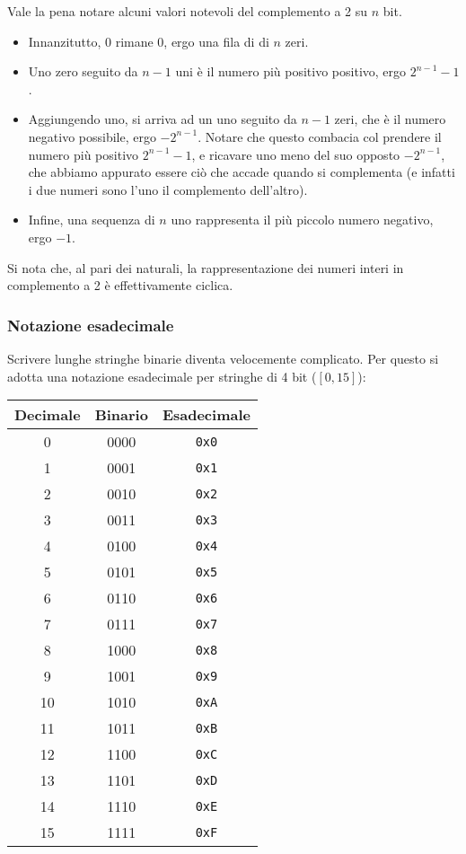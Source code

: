 \documentclass[a4paper,11pt]{article}
\begin{document}
Vale la pena notare alcuni valori notevoli del complemento a 2 su $n$ bit.
\begin{itemize}
	\item Innanzitutto, 0 rimane 0, ergo una fila di di $n$ zeri.
	\item Uno zero seguito da $n-1$ uni è il numero più positivo positivo, ergo $2^{n-1} -1$.
	\item Aggiungendo uno, si arriva ad un uno seguito da $n - 1$ zeri, che è il numero negativo possibile, ergo $-2^{n-1}$. 
		Notare che questo combacia col prendere il numero più positivo $2^{n-1} -1$, e ricavare uno meno del suo opposto $-2^{n-1}$, che abbiamo appurato essere ciò che accade quando si complementa (e infatti i due numeri sono l'uno il complemento dell'altro).
	\item Infine, una sequenza di $n$ uno rappresenta il più piccolo numero negativo, ergo $-1$.
\end{itemize}

Si nota che, al pari dei naturali, la rappresentazione dei numeri interi in complemento a 2 è effettivamente ciclica.

\subsubsection{Notazione esadecimale}
Scrivere lunghe stringhe binarie diventa velocemente complicato. 
Per questo si adotta una notazione esadecimale per stringhe di 4 bit ($[0, 15]$):

\begin{table}[h!]
    \centering
    \begin{tabular}{ c | c | c }
        \bfseries Decimale & \bfseries Binario & \bfseries Esadecimale \\
        \hline
        0  & 0000 & \texttt{0x0} \\
        1  & 0001 & \texttt{0x1} \\
        2  & 0010 & \texttt{0x2} \\
        3  & 0011 & \texttt{0x3} \\
        4  & 0100 & \texttt{0x4} \\
        5  & 0101 & \texttt{0x5} \\
        6  & 0110 & \texttt{0x6} \\
        7  & 0111 & \texttt{0x7} \\
        8  & 1000 & \texttt{0x8} \\
        9  & 1001 & \texttt{0x9} \\
        10 & 1010 & \texttt{0xA} \\
        11 & 1011 & \texttt{0xB} \\
        12 & 1100 & \texttt{0xC} \\
        13 & 1101 & \texttt{0xD} \\
        14 & 1110 & \texttt{0xE} \\
        15 & 1111 & \texttt{0xF} \\
    \end{tabular}
\end{table}
\end{document}
